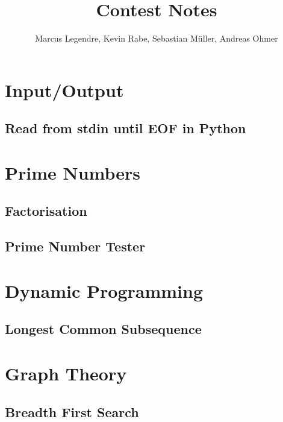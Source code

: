 \documentclass[11pt]{article}
\title{Contest Notes}
\author{Marcus Legendre, Kevin Rabe, Sebastian Müller, Andreas Ohmer}
\date{}
\begin{document}
\maketitle

\tableofcontents


\section{Input/Output}

\subsection{Read from stdin until EOF in Python}



\section{Prime Numbers}

\subsection{Factorisation}


\subsection{Prime Number Tester}



\section{Dynamic Programming}

\subsection{Longest Common Subsequence}



\section{Graph Theory}

\subsection{Breadth First Search}

\end{document}

